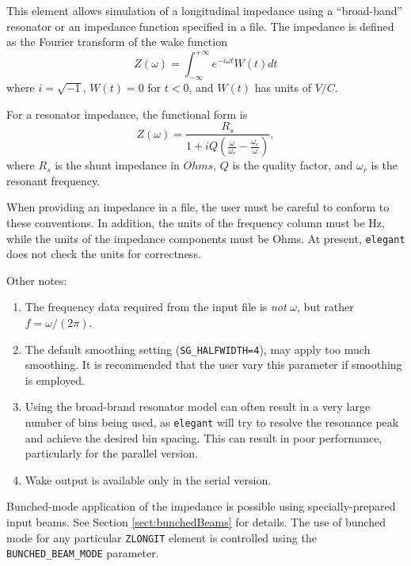 This element allows simulation of a longitudinal impedance using a
``broad-band'' resonator or an impedance function specified in a file.
The impedance is defined as the Fourier transform of the wake function
\begin{equation}
Z(\omega) = \int_{-\infty}^{+\infty} e^{-i \omega t} W(t) dt
\end{equation}
where $i = \sqrt{-1}$, $W(t)=0$ for $t<0$, and $W(t)$ has units of $V/C$.

For a resonator impedance, the functional form is
\begin{equation}
Z(\omega) = \frac{R_s}{1 + iQ(\frac{\omega}{\omega_r} - \frac{\omega_r}{\omega})},
\end{equation}
where $R_s$ is the shunt impedance in $Ohms$, $Q$ is the quality
factor, and $\omega_r$ is the resonant frequency.

When providing an impedance in a file, the user must be careful to conform to these
conventions. In addition, the units of the frequency column must be Hz, while the units
of the impedance components must be Ohms.
At present, {\tt elegant} does not check the units for correctness.

Other notes:
\begin{enumerate}
\item The frequency data required from the input file is {\em not} $\omega$, but rather
  $f = \omega/(2 \pi)$.
\item The default smoothing setting ({\tt SG\_HALFWIDTH=4}), may apply too much smoothing.
  It is recommended that the user vary this parameter if smoothing is employed.
\item Using the broad-brand resonator model can often result in a very large number of bins
 being used, as {\tt elegant} will try to resolve the resonance peak and achieve the desired
 bin spacing. This can result in poor performance, particularly for the parallel version.
\item Wake output is available only in the serial version.
\end{enumerate}

Bunched-mode application of the impedance is possible using specially-prepared input
beams. 
See Section \ref{sect:bunchedBeams} for details.
The use of bunched mode for any particular \verb|ZLONGIT| element is controlled using the \verb|BUNCHED_BEAM_MODE| parameter.
